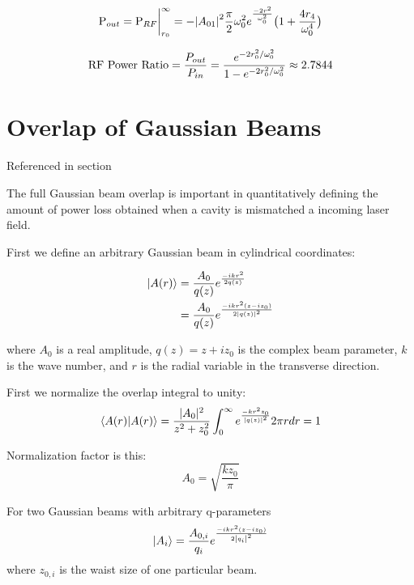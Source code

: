 \begin{appendices}
	\begin{equation}
	\text{P}_{out} \\
	= \text{P}_{RF} \biggr\rvert_{r_0}^{\infty}\\ 
	= - \abs{A_{01}}^2  \frac{\pi}{2} \omega_{0}^2 e^{\frac{-2r^2}{\omega_{0}^2}} \big(1 + \frac{4 r_4}{\omega_{0}^4} \big) 
	\end{equation}
	
	\begin{equation}
	\text{RF Power Ratio} 
	= \frac{P_{out}}{P_{in}} \\
	= \frac{e^{-2r_0^2/ \omega_{0}^2}} {1 - e^{-2r_0^2/ \omega_{0}^2 }} \approx 2.7844
	\end{equation}
	
	\chapter{Overlap of Gaussian Beams}
	
	Referenced in section
	
	The full Gaussian beam overlap is important in quantitatively defining the amount of power loss obtained when a cavity is mismatched a incoming laser field.
	
	First we define an arbitrary Gaussian beam in cylindrical coordinates:
	
	\begin{equation}
	\begin{split}
	\ket{A(r)} 
	&= \frac{A_0}{q(z)} e^{\frac{-ikr^2}{2q(z)}}\\
	&= \frac{A_0}{q(z)} e^{\frac{-ikr^2(z-iz_0)}{2\abs{q(z)}^2}}
	\end{split}
	\end{equation}
	
	where $A_0$ is a real amplitude, $q(z)= z + i z_0$ is the complex beam parameter, $k$ is the wave number, and $r$ is the radial variable in the transverse direction.

	First we normalize the overlap integral to unity:
	\begin{equation}
	\braket{A(r)|A(r)} 
	=  \frac{\rvert A_0 \rvert^2}{z^2+z_0^2} \int_{0}^{\infty} e^{\frac{-kr^2 z_0}{\abs{q(z)}^2}} 2 \pi r dr = 1
	\end{equation}

	Normalization factor is this:
	\begin{equation}
	A_0 = \sqrt{\frac{k z_0}{\pi}}
	\end{equation}

	For two Gaussian beams with arbitrary q-parameters
	\begin{equation}
	\ket{A_i} = \frac{A_{0,i}}{q_i} e^{ \frac{-ikr^2(z-iz_0)}{2\abs{q_i}^2 }}
	\end{equation}
	where $z_{0,i}$ is the waist size of one particular beam.
	

\end{appendices}
